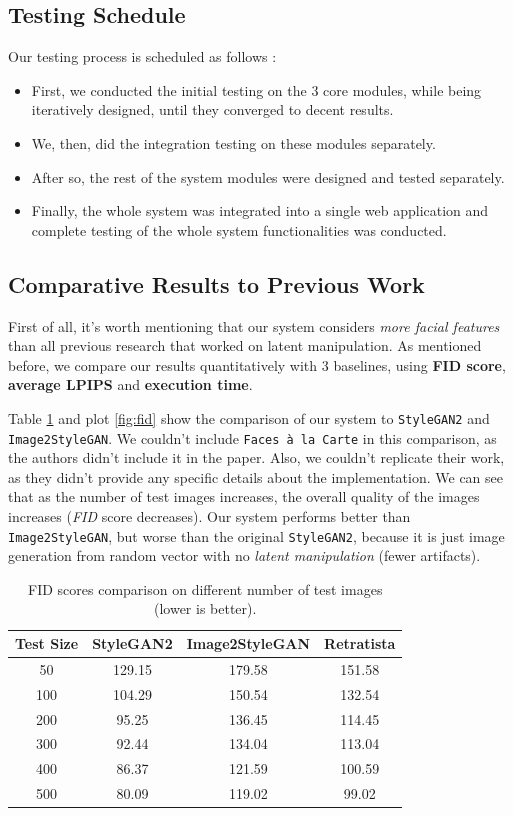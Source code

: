 \subsection{Testing Schedule}
Our testing process is scheduled as follows :
\begin{itemize}
    \item First, we conducted the initial testing on the $3$ core modules, while being iteratively designed, until they converged to decent results.
    \item We, then, did the integration testing on these modules separately.
    \item After so, the rest of the system modules were designed and tested separately.
    \item Finally, the whole system was integrated into a single web application and complete testing of the whole system functionalities was conducted.
\end{itemize}

\subsection{Comparative Results to Previous Work}
First of all, it's worth mentioning that our system considers \emph{more facial features} than all previous research that worked on latent manipulation. As mentioned before, we compare our results quantitatively with $3$ baselines, using \textbf{FID score}, \textbf{average LPIPS} and \textbf{execution time}.

Table \ref{tab:fid} and plot \ref{fig:fid} show the comparison of our system to \texttt{StyleGAN2} and \texttt{Image2StyleGAN}. We couldn't include \texttt{Faces à la Carte} in this comparison, as the authors didn't include it in the paper. Also, we couldn't replicate their work, as they didn't provide any specific details about the implementation. We can see that as the number of test images increases, the overall quality of the images increases (\emph{FID} score decreases). Our system performs better than \texttt{Image2StyleGAN}, but worse than the original \texttt{StyleGAN2}, because it is just image generation from random vector with no \emph{latent manipulation} (fewer artifacts).

\begin{table}[ht]
\centering
\caption{FID scores comparison on different number of test images (lower is better).}
\begin{tabular}[t]{| c | c | c | c |}
\hline
Test Size & StyleGAN2 & Image2StyleGAN & Retratista \\
\hline
50 & 129.15 & 179.58 & 151.58 \\
\hline
100 & 104.29 & 150.54 & 132.54 \\
\hline
200 & 95.25 & 136.45 & 114.45 \\
\hline
300 & 92.44 & 134.04 & 113.04 \\
\hline
400 & 86.37 & 121.59 & 100.59 \\
\hline
500 & 80.09 & 119.02 & 99.02 \\
\hline
\end{tabular}
\label{tab:fid}
\end{table}

